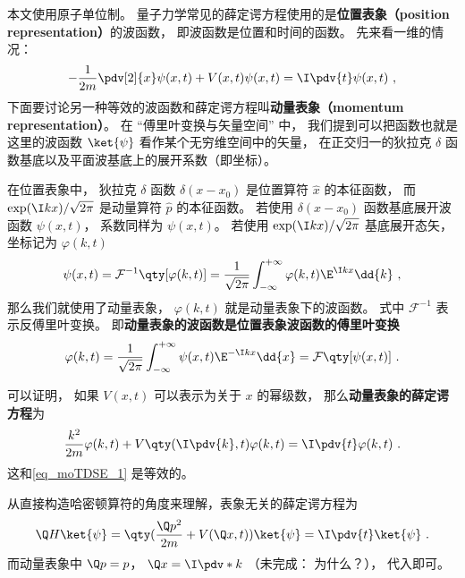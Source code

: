 

本文使用原子单位制。 量子力学常见的薛定谔方程使用的是\textbf{位置表象（position representation）}的波函数， 即波函数是位置和时间的函数。 先来看一维的情况：
\begin{equation}\label{eq_moTDSE_1}
-\frac{1}{2m} \pdv[2]{x}\psi(x, t) + V(x,t)\psi(x,t) = \I \pdv{t} \psi(x,t)~,
\end{equation}
下面要讨论另一种等效的波函数和薛定谔方程叫\textbf{动量表象（momentum representation）}。 在 “傅里叶变换与矢量空间” 中， 我们提到可以把函数也就是这里的波函数 $\ket{\psi}$ 看作某个无穷维空间中的矢量， 在正交归一的狄拉克 $\delta$ 函数基底以及平面波基底上的展开系数（即坐标）。

在位置表象中， 狄拉克 $\delta$ 函数 $\delta(x-x_0)$ 是位置算符 $\hat x$ 的本征函数， 而 $\exp(\I kx)/\sqrt{2\pi}$ 是动量算符 $\hat p$ 的本征函数。 若使用 $\delta(x-x_0)$ 函数基底展开波函数 $\psi(x, t)$， 系数同样为 $\psi(x, t)$。 若使用 $\exp(\I kx)/\sqrt{2\pi}$ 基底展开态矢， 坐标记为 $\varphi(k, t)$
\begin{equation}\label{eq_moTDSE_2}
\psi(x,t) = \mathcal{F}^{-1} \qty[\varphi(k,t)] = \frac{1}{\sqrt{2\pi}}\int_{-\infty}^{+\infty} \varphi(k,t)\E^{\I kx}\dd{k} ~,
\end{equation}
那么我们就使用了动量表象， $\varphi(k, t)$ 就是动量表象下的波函数。 式中 $\mathcal{F}^{-1}$ 表示反傅里叶变换。 即\textbf{动量表象的波函数是位置表象波函数的傅里叶变换}
\begin{equation}
\varphi(k,t) = \frac{1}{\sqrt{2\pi}}\int_{-\infty}^{+\infty} \psi(x,t)\E^{-\I kx}\dd{x} = \mathcal{F}\qty[\psi(x, t)]~.
\end{equation}

可以证明， 如果 $V(x,t)$ 可以表示为关于 $x$ 的幂级数， 那么\textbf{动量表象的薛定谔方程}为
\begin{equation}\label{eq_moTDSE_3}
\frac{k^2}{2m}\varphi(k, t) + V\qty(\I \pdv{k}, t)\varphi(k, t) = \I \pdv{t} \varphi(k,t)~.
\end{equation}
这和\autoref{eq_moTDSE_1} 是等效的。

从直接构造哈密顿算符的角度来理解，表象无关的薛定谔方程为
\begin{equation}
\Q H\ket{\psi} = \qty(\frac{\Q p^2}{2m} + V(\Q x, t))\ket{\psi} = \I \pdv{t}\ket{\psi}~.
\end{equation}
而动量表象中 $\Q p = p$， $\Q x  = \I \pdv*{k}$ （未完成： 为什么？）， 代入即可。


